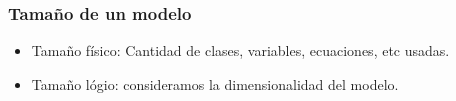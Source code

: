 \documentclass[aspectratio=169,10pt]{beamer}
\begin{document}
\begin{frame}[fragile]
\frametitle{Tama\~no de un modelo} 
\begin{itemize}
    \item Tama\~no f\'isico: Cantidad de clases, variables, ecuaciones, etc usadas.
    \item Tama\~no l\'ogio: consideramos la dimensionalidad del modelo.
\end{itemize}
 
\end{frame}

\end{document}
